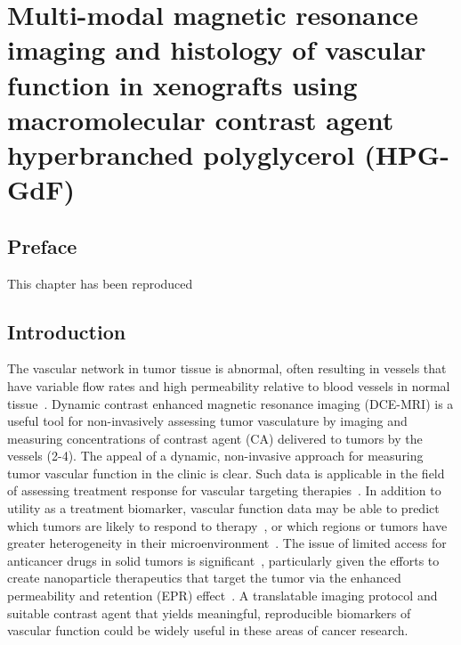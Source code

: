 
\chapter[MRI and histology of vascular function in xenografts using HPG]{Multi-modal magnetic resonance imaging and histology of vascular function in xenografts using macromolecular contrast agent hyperbranched polyglycerol (HPG-GdF)}
\label{ch:HPG}

\section{Preface}
This chapter has been reproduced 

\section{Introduction}

The vascular network in tumor tissue is abnormal, often resulting in vessels that have variable flow rates and high permeability relative to blood vessels in normal tissue~\cite{McDonald:2002ut}.
Dynamic contrast enhanced magnetic resonance imaging (DCE-MRI) is a useful tool for non-invasively assessing tumor vasculature by imaging and measuring concentrations of contrast agent (CA) delivered to tumors by the vessels (2-4).
The appeal of a dynamic, non-invasive approach for measuring tumor vascular function in the clinic is clear.
Such data is applicable in the field of assessing treatment response for vascular targeting therapies~\cite{OConnor:2012ie,Barrett:2006jx,Leach:2003fy}.
In addition to utility as a treatment biomarker, vascular function data may be able to predict which tumors are likely to respond to therapy~\cite{DeBruyne:2012cq,Kelly:2011cf,Bains:2009hh}, or which regions or tumors have greater heterogeneity in their microenvironment~\cite{OConnor:2011jm,Alic:2011hw}.
The issue of limited access for anticancer drugs in solid tumors is significant~\cite{Minchinton:2006gs}, particularly given the efforts to create nanoparticle therapeutics that target the tumor via the enhanced permeability and retention (EPR) effect~\cite{Jain:2001uf,Chauhan:2011fi}.
A translatable imaging protocol and suitable contrast agent that yields meaningful, reproducible biomarkers of vascular function could be widely useful in these areas of cancer research.

